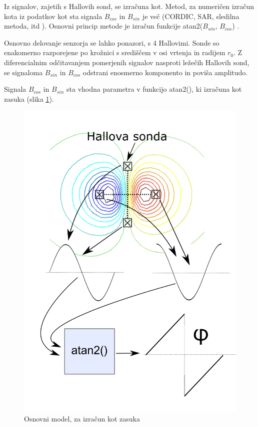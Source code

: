 Iz signalov, zajetih s Hallovih sond, se izračuna kot. Metod, za numeričen izračun kota iz podatkov kot sta signala $B_{cos}$ in $B_{sin}$ je več (CORDIC, SAR, sledilna metoda, itd \cite{ICHaus_interpolate}). Osnovni
princip metode je izračun funkcije atan2($B_{sin}$, $B_{cos}$) \cite{atan2Matlab}.

Osnovno delovanje senzorja se lahko ponazori, s 4 Hallovimi. Sonde so enakomerno razporejene po krožnici s središčem v osi vrtenja in radijem  $r_0$. Z diferencialnim odčitavanjem pomerjenih signalov nasproti ležečih Hallovih sond, se signaloma $B_{sin}$ in $B_{cos}$ odstrani enosmerno komponento in poviša amplitudo.

Signala $B_{cos}$ in $B_{sin}$ sta vhodna parametra v funkcijo atan2(), ki izračuna kot zasuka (slika \ref{opis_modela}).
\begin{figure}[ht]
	\centering
	\includegraphics[width=0.9\columnwidth]{./Slike/opis_modela.png}
	\caption{Osnovni model, za izračun kot zasuka}
	\label{opis_modela}
\end{figure}
